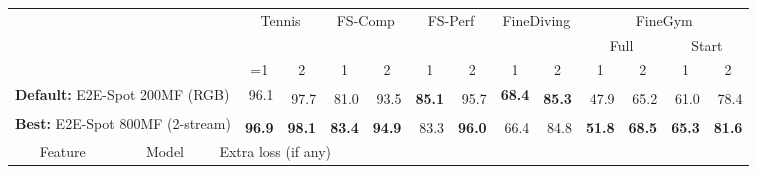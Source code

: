 \documentclass[runningheads]{llncs}
\newcommand{\OURMETHOD}{{E2E-Spot}\xspace}
\newcommand{\fscomp}{{FS-Comp}\xspace}
\newcommand{\fsperf}{{FS-Perf}\xspace}
\newcommand{\tennis}{{Tennis}\xspace}
\newcommand{\finegym}{{FineGym}\xspace}
\newcommand{\finediving}{{FineDiving}\xspace}
\newcommand{\best}[1]{\underline{#1}}
\newcommand{\sota}[1]{\textbf{#1}}
\newcommand{\nms}{\textsuperscript{\textdagger}}
\begin{document}
\renewcommand{\tabcolsep}{0.05cm}
\begin{table*}[p]
    \centering
    \caption{{\bf Spotting performance (mAP @  frames)} using pre-trained features without fine-tuning.
\textdagger~indicates NMS.
The best baseline scores are \best{underlined}.
Due to the low performance of I3D~\cite{i3d} features (compared to TSP~\cite{tsp}), we do not extract I3D features for \finediving and \finegym.
    }
    \label{tab:supp_full_pretrained}
    {
    \tiny
    \begin{tabularx}{\textwidth}{lll
        rr
        rr
        rr
        rr
        rr
        rr
    }
        \toprule
        &&
            & \multicolumn{2}{c}{\tennis}
            & \multicolumn{2}{c}{\fscomp}
            & \multicolumn{2}{c}{\fsperf}
            & \multicolumn{2}{c}{\finediving}
            & \multicolumn{4}{c}{\finegym}
            \\
        &&
            & \multicolumn{2}{c}{}
            & \multicolumn{2}{c}{}
            & \multicolumn{2}{c}{}
            & \multicolumn{2}{c}{}
            & \multicolumn{2}{c}{Full}
            & \multicolumn{2}{c}{Start}
            \\
        &&
            & \multicolumn{1}{c}{=1}
            & \multicolumn{1}{c}{2}
            & \multicolumn{1}{c}{1}
            & \multicolumn{1}{c}{2}
            & \multicolumn{1}{c}{1}
            & \multicolumn{1}{c}{2}
            & \multicolumn{1}{c}{1}
            & \multicolumn{1}{c}{2}
            & \multicolumn{1}{c}{1}
            & \multicolumn{1}{c}{2}
            & \multicolumn{1}{c}{1}
            & \multicolumn{1}{c}{2}
            \\
        \midrule

        \multicolumn{3}{l}{{\bf Default:} \OURMETHOD 200MF (RGB)}
            & 96.1 & \nms 97.7
            & \nms 81.0 & \nms 93.5 & \nms \sota{85.1} & \nms 95.7 & \sota{68.4} & \nms \sota{85.3}
            & \nms 47.9 & \nms 65.2
            & \nms 61.0 & \nms 78.4
            \\
        \multicolumn{3}{l}{{\bf Best:} \OURMETHOD 800MF (2-stream)}
            & \nms \sota{96.9} & \nms \sota{98.1}
            & \nms \sota{83.4} & \nms \sota{94.9} & \nms 83.3 & \nms \sota{96.0} & \nms 66.4 & \nms 84.8
            & \nms \sota{51.8} & \nms \sota{68.5}
            & \nms \sota{65.3} & \nms \sota{81.6}
            \\

        \midrule
        \multicolumn{1}{c}{Feature} & \multicolumn{1}{c}{Model} &
            \multicolumn{4}{l}{Extra loss (if any)} \\


\end{tabularx}}
\end{table*}
\end{document}
